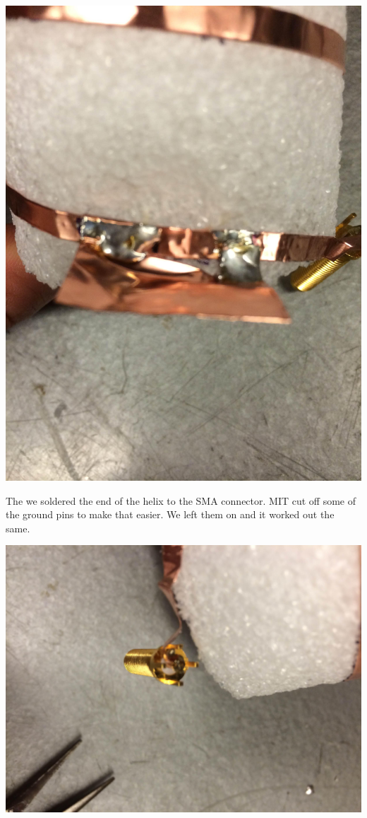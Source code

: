 \documentclass[11pt]{article} %
\begin{document}
\begin{center}
\includegraphics[scale=0.10]{feed/13.jpeg}
\end{center}


The we soldered the end of the helix to the SMA connector. MIT cut off some of the ground pins to make that easier. We left them on and it worked out the same. 

\begin{center}
\includegraphics[scale=0.10]{feed/14.jpeg}
\end{center}
\end{document}

